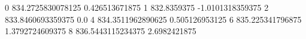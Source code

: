 0 834.2725830078125 0.426513671875
1 832.8359375 -1.0101318359375
2 833.8460693359375 0.0
4 834.3511962890625 0.505126953125
6 835.225341796875 1.3792724609375
8 836.5443115234375 2.6982421875
